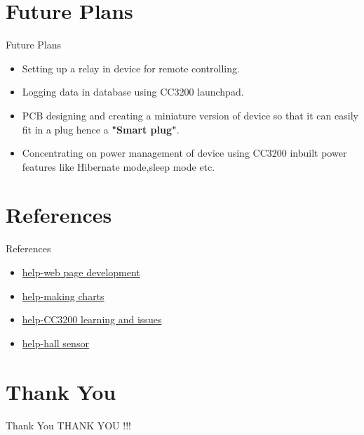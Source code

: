 \documentclass[10pt, a4paper]{beamer}
\begin{document}
\section{Future Plans}
\begin{frame}{Future Plans}
	\begin{itemize}
		\item Setting up a relay in device for remote controlling.
		\item Logging data in database using CC3200 launchpad.
		\item PCB designing and creating a miniature version of device so that it can easily fit in a plug hence a \textbf{"Smart plug"}.
		\item Concentrating on power management of device using CC3200 inbuilt power features like Hibernate mode,sleep mode etc.   
	\end{itemize}
\end{frame}

\section{References}
\begin{frame}{References}
	\begin{itemize}
	\item \href{stackoverflow.com}{help-web page development}
	\item \href{developers.google.com/chart}{help-making charts}
	\item \href{e2e.ti.com}{help-CC3200 learning and issues}
	\item \href{http://arduinosensors.com/index.php/tag/allegro-acs712}{help-hall sensor}
	\end{itemize}
\end{frame}
\section{Thank You}
\begin{frame}{Thank You}
	\centering THANK YOU !!!
\end{frame}
\end{document}
